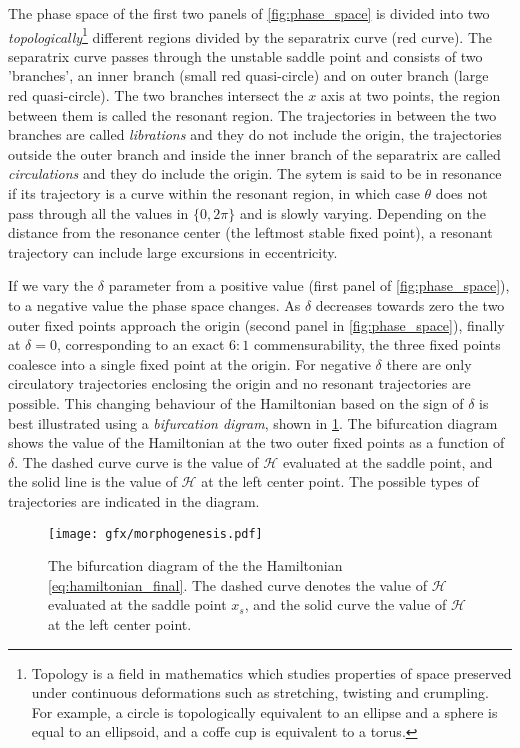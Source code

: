 The phase space of the first two panels of \cref{fig:phase_space} is divided into two
\emph{topologically}\footnote{Topology is a field in mathematics which studies 
properties of space preserved under continuous deformations such as stretching, twisting
and crumpling. For example, a circle is topologically equivalent to an ellipse and 
a sphere is equal to an ellipsoid, and a coffe cup is equivalent to a torus.} different
regions divided by the separatrix curve (red curve). The separatrix curve passes through
the unstable saddle point and consists of two
'branches', an inner branch (small red quasi-circle) and on outer branch (large red
quasi-circle).  The two branches intersect the $x$ axis at two points, the region between
them is called the resonant region. The trajectories 
in between the two branches are called \emph{librations} and they do not include the origin,
the trajectories outside the outer branch and inside the inner branch of the separatrix
are called \emph{circulations} and they do include the origin. The sytem is said to be
in resonance if its trajectory is a curve within the resonant region, in which case $\theta$
does not pass through all the values in $\{0,2\pi\}$ and is slowly varying. Depending on the
distance from the resonance center (the leftmost stable fixed point), a resonant trajectory
can include large excursions in eccentricity.

If we vary the $\delta$ parameter from a positive value (first panel of \cref{fig:phase_space}),
to a negative value the phase space changes. As $\delta$ decreases towards zero the two
outer fixed points approach the origin (second panel in \cref{fig:phase_space}), finally at 
$\delta=0$, corresponding to an exact $6:1$ commensurability, the three fixed points coalesce
into a single fixed point at the origin. For negative $\delta$ there are only circulatory 
trajectories enclosing the origin and no resonant trajectories are possible. This changing
behaviour of the Hamiltonian based on the sign of $\delta$ is best illustrated using
a \emph{bifurcation digram}, shown in \cref{fig:morphogenesis}. The bifurcation diagram
shows the value of the Hamiltonian at the two outer fixed points as a function of $\delta$.
The dashed curve curve is the value of $\mathcal{H}$ evaluated at the saddle point, and the 
solid line is the value of $\mathcal{H}$ at the left center point. The possible 
types of trajectories are indicated in the diagram.
\begin{figure}[htb]
\centering
\texttt{[image: gfx/morphogenesis.pdf]}
    \caption{The bifurcation diagram of the the Hamiltonian \ref{eq:hamiltonian_final}. 
    The dashed curve denotes the value of $\mathcal{H}$ evaluated at the saddle point $x_s$, and 
    the solid curve the value of $\mathcal{H}$ at the left center point.}
\label{fig:morphogenesis}
\end{figure}

